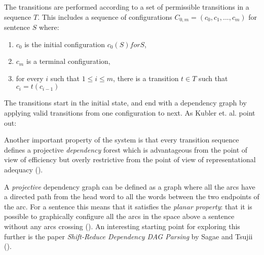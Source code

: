 \documentclass[10pt]{article}
\begin{document}
The transitions are performed according to a set of permissible transitions in a sequence $T$. This includes a sequence of configurations $C_{0,m} = (c_0, c_1, ..., c_m)$ for sentence $S$ where:

\begin{enumerate}
\item $c_0$ is the initial configuration $c_0(S) for S$,
\item $c_m$ is a terminal configuration,
\item for every $i$ such that $1 \leq i \leq m$, there is a transition $t \in T$ such that $c_i = t(c_{i-1})$
\end{enumerate}

The transitions start in the initial state, and end with a dependency graph by applying valid transitions from one configuration to next. As Kubler et. al. point out:

\begin{displayquote}
Another important property of the system is that every transition sequence defines a projective \textit{dependency} forest which is advantageous from the point of view of efficiency but overly restrictive from the point of view of representational adequacy (\cite{kubler-sandra-mcdonald-ryan-nivre-book}).
\end{displayquote}

A \textit{projective} dependency graph can be defined as a graph where all the arcs have a directed path from the head word to all the words between the two endpoints of the arc. For a sentence this means that it satisfies the \textit{planar property}: that it is possible to graphically configure all the arcs in the space above a sentence without any arcs crossing (\cite{kubler-sandra-mcdonald-ryan-nivre-book}). An interesting starting point for exploring this further is the paper \textit{Shift-Reduce Dependency DAG Parsing} by Sagae and Tsujii (\cite{sagae2008shift}).

\end{document}

